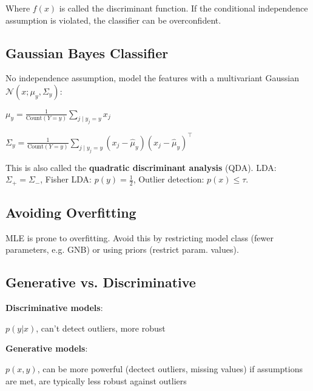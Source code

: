 Where \color{Red}$f(x)$\color{Black} is called the discriminant function. If the conditional independence assumption is violated, the classifier can be overconfident.

\subsection*{Gaussian Bayes Classifier}

No independence assumption, model the features with a multivariant Gaussian $\mathcal{N}(x; \mu_y, \Sigma_y)$:

\quad $\mu_{y} = \frac{1}{\text{Count}(Y = y)} \sum_{j \; | \; y_j = y} x_{j}$

\quad $\Sigma_{y} = \frac{1}{\text{Count}(Y = y)} \sum_{j \; | \; y_j = y} (x_{j} - \hat \mu_{y}) (x_{j} - \hat \mu_{y})^\top$

This is also called the \textbf{quadratic discriminant analysis} (QDA). LDA: $\Sigma_+ = \Sigma_-$, Fisher LDA: $p(y) = \frac{1}{2}$, Outlier detection: $p(x) \leq \tau$.

\subsection*{Avoiding Overfitting}

MLE is prone to overfitting. Avoid this by restricting model class (fewer parameters, e.g. GNB) or using priors (restrict param. values).

\subsection*{Generative vs. Discriminative}

\textbf{Discriminative models}:

$p(y | x)$, can't detect outliers, more robust

\textbf{Generative models}:

$p(x,y)$, can be more powerful (dectect outliers, missing values) if assumptions are met, are typically less robust against outliers
